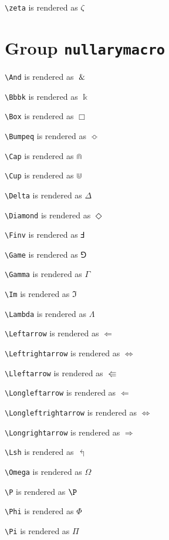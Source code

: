 \texttt{\textbackslash zeta} is rendered as $\ce{\zeta}$

\section{ Group \texttt{nullary\textunderscore macro}}

\texttt{\textbackslash And} is rendered as $\And$

\texttt{\textbackslash Bbbk} is rendered as $\Bbbk$

\texttt{\textbackslash Box} is rendered as $\Box$

\texttt{\textbackslash Bumpeq} is rendered as $\Bumpeq$

\texttt{\textbackslash Cap} is rendered as $\Cap$

\texttt{\textbackslash Cup} is rendered as $\Cup$

\texttt{\textbackslash Delta} is rendered as $\Delta$

\texttt{\textbackslash Diamond} is rendered as $\Diamond$

\texttt{\textbackslash Finv} is rendered as $\Finv$

\texttt{\textbackslash Game} is rendered as $\Game$

\texttt{\textbackslash Gamma} is rendered as $\Gamma$

\texttt{\textbackslash Im} is rendered as $\Im$

\texttt{\textbackslash Lambda} is rendered as $\Lambda$

\texttt{\textbackslash Leftarrow} is rendered as $\Leftarrow$

\texttt{\textbackslash Leftrightarrow} is rendered as $\Leftrightarrow$

\texttt{\textbackslash Lleftarrow} is rendered as $\Lleftarrow$

\texttt{\textbackslash Longleftarrow} is rendered as $\Longleftarrow$

\texttt{\textbackslash Longleftrightarrow} is rendered as $\Longleftrightarrow$

\texttt{\textbackslash Longrightarrow} is rendered as $\Longrightarrow$

\texttt{\textbackslash Lsh} is rendered as $\Lsh$

\texttt{\textbackslash Omega} is rendered as $\Omega$

\texttt{\textbackslash P} is rendered as $\P$

\texttt{\textbackslash Phi} is rendered as $\Phi$

\texttt{\textbackslash Pi} is rendered as $\Pi$


